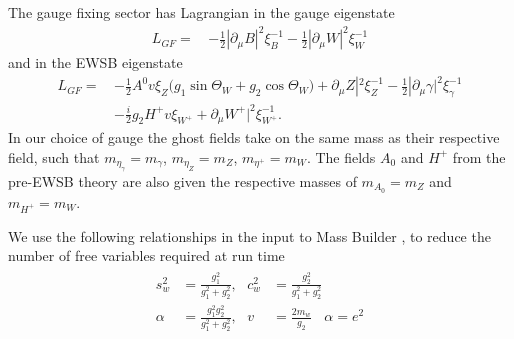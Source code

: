 \documentclass[11pt]{article}
\newcommand{\mb}{\textsf{Mass Builder} \! }
\begin{document}
The gauge fixing sector has Lagrangian in the gauge eigenstate
\begin{align} 
L_{GF} = \, &-\frac{1}{2} |\partial_{\mu}B|^2 \xi_{B}^{-1}  -\frac{1}{2} |\partial_{\mu}W|^2 \xi_{W}^{-1} 
\end{align} 
and in the EWSB eigenstate
\begin{align} 
L_{GF} = \, & -\frac{1}{2} A^0 v \xi_{Z} \Big(g_1 \sin\Theta_W   + g_2 \cos\Theta_W  \Big) + \partial_{\mu}Z|^2 \xi_{Z}^{-1}  -\frac{1}{2} |\partial_{\mu}\gamma|^2 \xi_{\gamma}^{-1} \\&-\frac{i}{2} g_2 H^+ v \xi_{W^+}  + \partial_{\mu}W^+|^2 \xi_{W^+}^{-1}.
\end{align} 
In our choice of gauge the ghost fields take on the same mass as their respective field, such that $m_{\eta_{\gamma}} = m_{\gamma}$, $m_{\eta_Z}=m_{Z}$, $m_{\eta^+}=m_{W}$.  The fields $A_0$ and $H^+$ from the pre-EWSB theory are also given the respective masses of $m_{A_0}=m_Z$ and $m_{H^+}=m_W$.

We use the following relationships in the input to \mb, to reduce the number of free variables required at run time
\begin{eqnarray}
\begin{split}
s_w^2&=\frac{g_1^2}{g_1^2+g_2^2}, \ \ \ c_w^2&=\frac{g_2^2}{g_1^2+g_2^2}\\
\alpha&=\frac{g_1^2g_2^2}{g_1^2+g_2^2}, \ \ \ v&=\frac{2m_w}{g_2} \ \ \ \ \alpha=e^2
\end{split}
\end{eqnarray}
\end{document}
